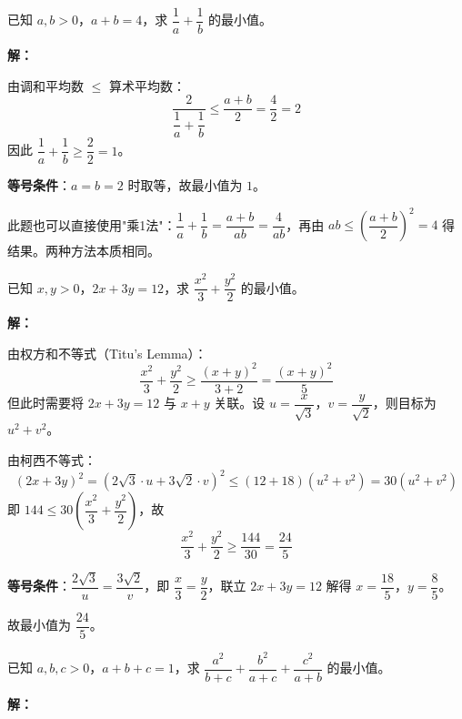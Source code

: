 \documentclass[12pt, a4paper]{ctexart}
\begin{document}
\begin{examplebox}[【例题1】均值不等式链的基本应用]
已知 $a,b>0$，$a+b=4$，求 $\dfrac{1}{a}+\dfrac{1}{b}$ 的最小值。
\end{examplebox}

\textbf{解：}

由调和平均数 $\leqslant$ 算术平均数：
\[
\frac{2}{\dfrac{1}{a}+\dfrac{1}{b}} \leqslant \frac{a+b}{2} = \frac{4}{2} = 2
\]
因此 $\dfrac{1}{a}+\dfrac{1}{b} \geqslant \dfrac{2}{2} = 1$。

\textbf{等号条件}：$a=b=2$ 时取等，故最小值为 $\boxed{1}$。

\begin{tipbox}[方法总结]
此题也可以直接使用"乘1法"：$\dfrac{1}{a}+\dfrac{1}{b} = \dfrac{a+b}{ab} = \dfrac{4}{ab}$，再由 $ab \leqslant \left(\dfrac{a+b}{2}\right)^2 = 4$ 得结果。两种方法本质相同。
\end{tipbox}

\begin{examplebox}[【例题2】权方和不等式求最值]
已知 $x,y>0$，$2x+3y=12$，求 $\dfrac{x^2}{3}+\dfrac{y^2}{2}$ 的最小值。
\end{examplebox}

\textbf{解：}

由权方和不等式（Titu's Lemma）：
\[
\frac{x^2}{3}+\frac{y^2}{2} \geqslant \frac{(x+y)^2}{3+2} = \frac{(x+y)^2}{5}
\]
但此时需要将 $2x+3y=12$ 与 $x+y$ 关联。设 $u = \dfrac{x}{\sqrt{3}}$，$v = \dfrac{y}{\sqrt{2}}$，则目标为 $u^2+v^2$。

由柯西不等式：
\[
(2x+3y)^2 = (2\sqrt{3}\cdot u+3\sqrt{2}\cdot v)^2 \leqslant (12+18)(u^2+v^2) = 30(u^2+v^2)
\]
即 $144 \leqslant 30\left(\dfrac{x^2}{3}+\dfrac{y^2}{2}\right)$，故
\[
\frac{x^2}{3}+\frac{y^2}{2} \geqslant \frac{144}{30} = \frac{24}{5}
\]

\textbf{等号条件}：$\dfrac{2\sqrt{3}}{u} = \dfrac{3\sqrt{2}}{v}$，即 $\dfrac{x}{3} = \dfrac{y}{2}$，联立 $2x+3y=12$ 解得 $x = \dfrac{18}{5}$，$y = \dfrac{8}{5}$。

故最小值为 $\boxed{\dfrac{24}{5}}$。

\begin{examplebox}[【例题3】柯西不等式的配凑应用]
已知 $a,b,c>0$，$a+b+c=1$，求 $\dfrac{a^2}{b+c}+\dfrac{b^2}{a+c}+\dfrac{c^2}{a+b}$ 的最小值。
\end{examplebox}

\textbf{解：}
\end{document}
